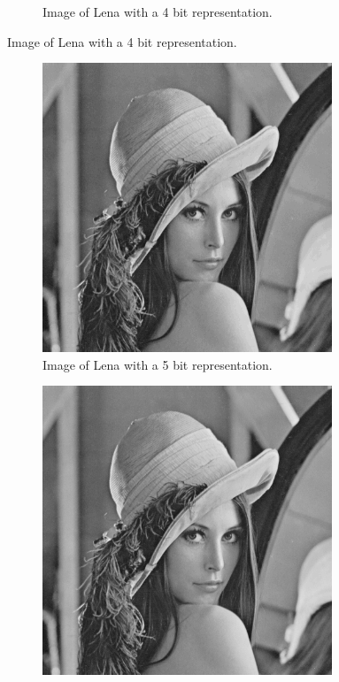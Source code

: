 \documentclass{article}
\theoremstyle{problemstyle}
\begin{document}
\begin{problem}
\begin{figure}[H]
\begin{subfigure}{.45\textwidth}
		\caption{Image of Lena with a 4 bit representation.}
		\label{fig:lena_b4}
	\end{subfigure}
\end{figure}
\begin{figure}[H]
	\begin{subfigure}{.45\textwidth}
		\centering
		\includegraphics[width=0.95\textwidth]{lena_b5.png}
		\caption{Image of Lena with a 5 bit representation.}
		\label{fig:lena_b5}
	\end{subfigure}
	\hfill
	\begin{subfigure}{.45\textwidth}
		\centering
		\includegraphics[width=0.95\textwidth]{lena_b6.png}

\end{subfigure}
\end{figure}
\end{problem}
\end{document}
